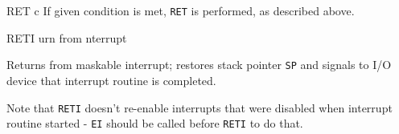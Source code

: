 \begin{basedescript}{
	\desclabelstyle{\multilinelabel}
	\desclabelwidth{3cm}}
\begin{DetailItem}{RET c}{}
		If given condition is met, {\tt RET} is performed, as described above.

		\begin{DetailEffects}
			\FlagsRETcc
		\end{DetailEffects}
						
		\begin{DetailTiming}
			\DetailTimeRegular[{\tt c}=false]{1}{5}
			\DetailTimeRegular[{\tt c}=true]{3}{11}
		\end{DetailTiming}

	\end{DetailItem}

	\pagebreak


	\begin{DetailItem}{RETI}{}
		{urn from nterrupt}
		{\SymRETI}

		Returns from maskable interrupt; restores stack pointer {\tt SP} and signals to I/O device that interrupt routine is completed.
		
		Note that {\tt RETI} doesn't re-enable interrupts that were disabled when interrupt routine started - {\tt EI} should be called before {\tt RETI} to do that.

		\begin{DetailEffects}
			\FlagsRETI
		\end{DetailEffects}
				
		\begin{DetailTiming}
			\DetailTime{4}{14}
		\end{DetailTiming}

	\end{DetailItem}



\end{basedescript}
